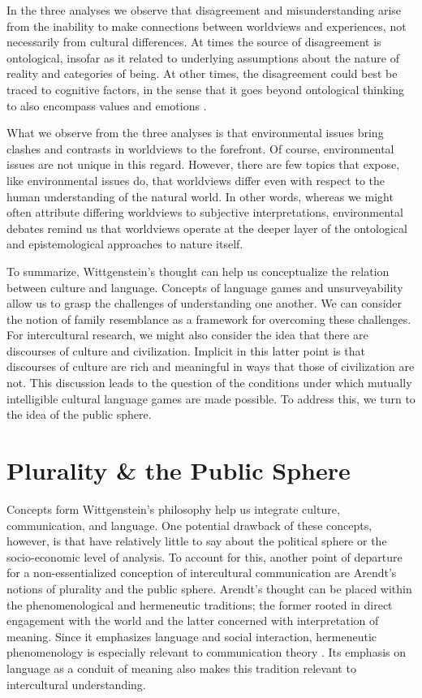 In the three analyses we observe that disagreement and misunderstanding arise from the inability to make connections between worldviews and experiences, not necessarily from cultural differences. At times the source of disagreement is ontological, insofar as it related to underlying assumptions about the nature of reality and categories of being. At other times, the disagreement could best be traced to cognitive factors, in the sense that it goes beyond ontological thinking to also encompass values and emotions \citep[114]{Palmer1996}. 

What we observe from the three analyses is that environmental issues bring clashes and contrasts in worldviews to the forefront. Of course, environmental issues are not unique in this regard. However, there are few topics that expose, like environmental issues do, that worldviews differ even with respect to the human understanding of the natural world. In other words, whereas we might often attribute differing worldviews to subjective interpretations, environmental debates remind us that worldviews operate at the deeper layer of the ontological and epistemological approaches to nature itself.

To summarize, Wittgenstein's thought can help us conceptualize the relation between culture and language. Concepts of language games and unsurveyability allow us to grasp the challenges of understanding one another. We can consider the notion of family resemblance as a framework for overcoming these challenges. For intercultural research, we might also consider the idea that there are discourses of culture and civilization. Implicit in this latter point is that discourses of culture are rich and meaningful in ways that those of civilization are not. This discussion leads to the question of the conditions under which mutually intelligible cultural language games are made possible. To address this, we turn to the idea of the public sphere.

\section{Plurality \& the Public Sphere}

Concepts form Wittgenstein's philosophy help us integrate culture, communication, and language. One potential drawback of these concepts, however, is that have relatively little to say about the political sphere or the socio-economic level of analysis. To account for this, another point of departure for a non-essentialized conception of intercultural communication are Arendt's notions of plurality and the public sphere. Arendt's thought can be placed within the phenomenological and hermeneutic traditions; the former rooted in direct engagement with the world and the latter concerned with interpretation of meaning. Since it emphasizes language and social interaction, hermeneutic phenomenology is especially relevant to communication theory \citep[49]{Littlejohn2011a}. Its emphasis on language as a conduit of meaning also makes this tradition relevant to intercultural understanding.

